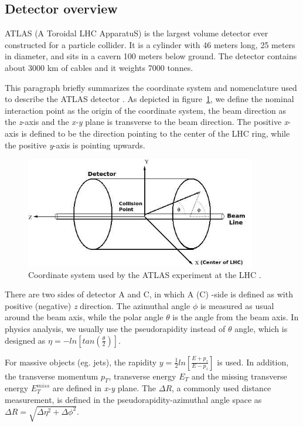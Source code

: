 \subsection{Detector overview}

ATLAS (A Toroidal LHC ApparatuS) is the largest volume detector ever constructed for a particle collider.
It is a cylinder with 46 meters long, 25 meters in diameter, and sits in a cavern 100 meters below ground.
The detector contains about 3000 km of cables and it weights 7000 tonnes.

This paragraph briefly summarizes the coordinate system and nomenclature used to describe the ATLAS detector \cite{Collaboration_2008}.
As depicted in figure~\ref{fig:coordinate}, we define the nominal interaction point as the origin of the coordinate system, the beam direction as the \textit{z}-axis and the \textit{x-y} plane is transverse to the beam direction.
The positive \textit{x}-axis is defined to be the direction pointing to the center of the LHC ring, 
while the positive \textit{y}-axis is pointing upwards.
\begin{figure}[!htb]
  \centering
  \includegraphics[width=0.9\textwidth]{figures/Detector/Coordinate_system_atlas.png}
  \caption{Coordinate system used by the ATLAS experiment at the LHC \cite{Perez:phdthesis}.}
  \label{fig:coordinate}
\end{figure}
There are two sides of detector A and C, in which A (C) -side is defined as with positive (negative) \textit{z} direction.
The azimuthal angle $\phi$ is measured as usual around the beam axis, while the polar angle $\theta$ is the angle from the beam axis.
In physics analysis, we usually use the pseudorapidity instead of $\theta$ angle, which is designed as $\eta = - ln \left[ tan\left( \frac{\theta}{2}\right) \right]$. 

For massive objects (eg. jets), the rapidity $y = \frac{1}{2} ln \left[ \frac{E+p_{z}}{E-p_{z}} \right]$ is used.
In addition, the transverse momentum $p_{T}$, transverse energy $E_{T}$ and the missing transverse energy $E_{T}^{miss}$ are defined in \textit{x-y} plane.
The $\Delta R$, a commonly used distance measurement, is defined in the pseudorapidity-azimuthal angle space as $\Delta R = \sqrt{ \Delta\eta^{2} + \Delta\phi^{2}}$.

